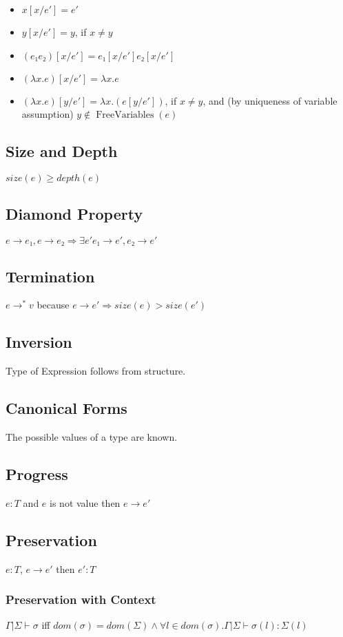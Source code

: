 \documentclass[10pt,a4paper]{article}
\newcommand{\on}{\operatorname}
\begin{document}
\begin{itemize}
\item $x[x/e'] = e'$
\item $y[x/e'] = y$, if $x ≠ y$
\item $(e₁ e₂)[x/e'] = e₁[x/e'] e₂[x/e']$
\item $(λx.e)[x/e'] = λx.e$
\item $(λx.e)[y/e'] = λx.(e[y/e'])$, if $x ≠ y$, and (by uniqueness of variable assumption) $y ∉ \on{FreeVariables}(e)$
\end{itemize}


\subsection{Size and Depth}
$size(e) \ge depth(e)$

\subsection{Diamond Property}
$e → e₁, e → e₂ ⇒ ∃e' e₁ → e', e₂ → e'$

\subsection{Termination}
$e →^* v$ because $e → e' ⇒ size(e) > size(e')$

\subsection{Inversion}
Type of Expression follows from structure.

\subsection{Canonical Forms}
The possible values of a type are known.

\subsection{Progress}
$e:T$ and $e$ is not value then $e → e'$

\subsection{Preservation}
$e:T$, $e→e'$ then $e':T$
\subsubsection{Preservation with Context}
$Γ|Σ \vdash σ$ iff $dom(σ) = dom(Σ) ∧ ∀l ∈ dom(σ). Γ|Σ \vdash σ(l) : Σ(l)$
\end{document}
